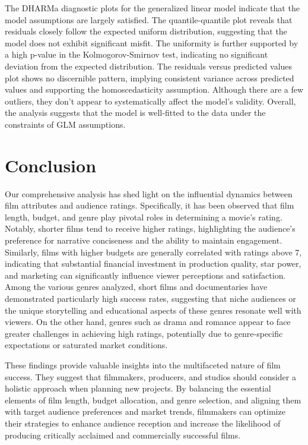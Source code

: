 \documentclass[
  11pt,
]{article}
\begin{document}
The DHARMa diagnostic plots for the generalized linear model indicate
that the model assumptions are largely satisfied. The quantile-quantile
plot reveals that residuals closely follow the expected uniform
distribution, suggesting that the model does not exhibit significant
misfit. The uniformity is further supported by a high p-value in the
Kolmogorov-Smirnov test, indicating no significant deviation from the
expected distribution. The residuals versus predicted values plot shows
no discernible pattern, implying consistent variance across predicted
values and supporting the homoscedasticity assumption. Although there
are a few outliers, they don't appear to systematically affect the
model's validity. Overall, the analysis suggests that the model is
well-fitted to the data under the constraints of GLM assumptions.

\hypertarget{conclusion}{%
\section{Conclusion}\label{conclusion}}

Our comprehensive analysis has shed light on the influential dynamics
between film attributes and audience ratings. Specifically, it has been
observed that film length, budget, and genre play pivotal roles in
determining a movie's rating. Notably, shorter films tend to receive
higher ratings, highlighting the audience's preference for narrative
conciseness and the ability to maintain engagement. Similarly, films
with higher budgets are generally correlated with ratings above 7,
indicating that substantial financial investment in production quality,
star power, and marketing can significantly influence viewer perceptions
and satisfaction. Among the various genres analyzed, short films and
documentaries have demonstrated particularly high success rates,
suggesting that niche audiences or the unique storytelling and
educational aspects of these genres resonate well with viewers. On the
other hand, genres such as drama and romance appear to face greater
challenges in achieving high ratings, potentially due to genre-specific
expectations or saturated market conditions.

These findings provide valuable insights into the multifaceted nature of
film success. They suggest that filmmakers, producers, and studios
should consider a holistic approach when planning new projects. By
balancing the essential elements of film length, budget allocation, and
genre selection, and aligning them with target audience preferences and
market trends, filmmakers can optimize their strategies to enhance
audience reception and increase the likelihood of producing critically
acclaimed and commercially successful films.
\end{document}
